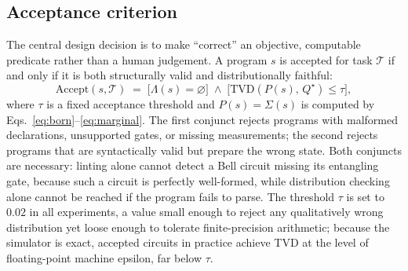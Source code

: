 \documentclass[11pt,a4paper]{article}
\newcommand{\tvd}{\mathrm{TVD}}
\begin{document}
\subsection{Acceptance criterion}
The central design decision is to make ``correct'' an objective, computable predicate rather than a human judgement. A program $s$ is accepted for task $\mathcal{T}$ if and only if it is both structurally valid and distributionally faithful:
\begin{equation}
\mathrm{Accept}(s,\mathcal{T})\;=\;\bigl[\Lambda(s)=\varnothing\bigr]\;\wedge\;\bigl[\tvd\!\left(P(s),\,Q^{\star}\right)\le\tau\bigr],
\label{eq:accept}
\end{equation}
where $\tau$ is a fixed acceptance threshold and $P(s)=\Sigma(s)$ is computed by Eqs.~\eqref{eq:born}--\eqref{eq:marginal}. The first conjunct rejects programs with malformed declarations, unsupported gates, or missing measurements; the second rejects programs that are syntactically valid but prepare the wrong state. Both conjuncts are necessary: linting alone cannot detect a Bell circuit missing its entangling gate, because such a circuit is perfectly well-formed, while distribution checking alone cannot be reached if the program fails to parse. The threshold $\tau$ is set to $0.02$ in all experiments, a value small enough to reject any qualitatively wrong distribution yet loose enough to tolerate finite-precision arithmetic; because the simulator is exact, accepted circuits in practice achieve TVD at the level of floating-point machine epsilon, far below $\tau$.
\end{document}
